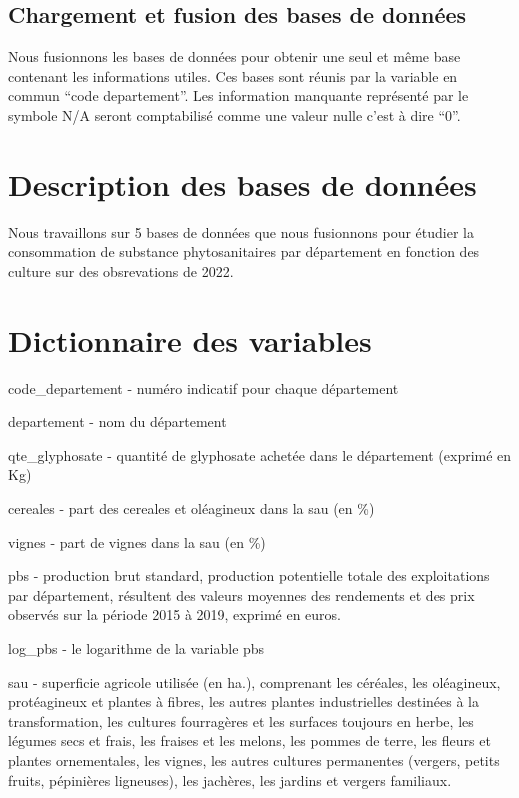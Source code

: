 \documentclass[
]{article}
\begin{document}
\subsection{Chargement et fusion des bases de
données}\label{chargement-et-fusion-des-bases-de-donnuxe9es}

Nous fusionnons les bases de données pour obtenir une seul et même base
contenant les informations utiles. Ces bases sont réunis par la variable
en commun ``code departement''. Les information manquante représenté par
le symbole N/A seront comptabilisé comme une valeur nulle c'est à dire
``0''.

\section{Description des bases de
données}\label{description-des-bases-de-donnuxe9es}

Nous travaillons sur 5 bases de données que nous fusionnons pour étudier
la consommation de substance phytosanitaires par département en fonction
des culture sur des obsrevations de 2022.

\section{Dictionnaire des variables}\label{dictionnaire-des-variables}

code\_departement - numéro indicatif pour chaque département

departement - nom du département

qte\_glyphosate - quantité de glyphosate achetée dans le département
(exprimé en Kg)

cereales - part des cereales et oléagineux dans la sau (en \%)

vignes - part de vignes dans la sau (en \%)

pbs - production brut standard, production potentielle totale des
exploitations par département, résultent des valeurs moyennes des
rendements et des prix observés sur la période 2015 à 2019, exprimé en
euros.

log\_pbs - le logarithme de la variable pbs

sau - superficie agricole utilisée (en ha.), comprenant les céréales,
les oléagineux, protéagineux et plantes à fibres, les autres plantes
industrielles destinées à la transformation, les cultures fourragères et
les surfaces toujours en herbe, les légumes secs et frais, les fraises
et les melons, les pommes de terre, les fleurs et plantes ornementales,
les vignes, les autres cultures permanentes (vergers, petits fruits,
pépinières ligneuses), les jachères, les jardins et vergers familiaux.
\end{document}
